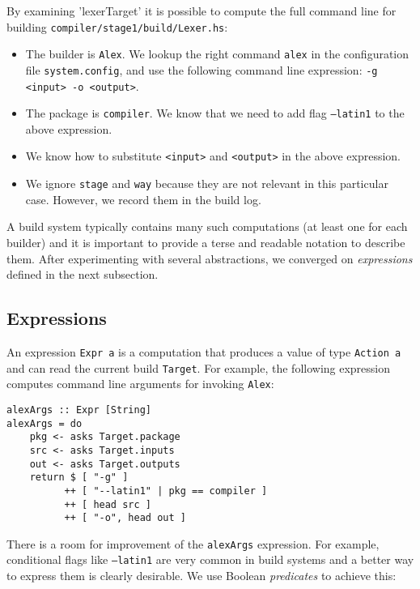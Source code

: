 \noindent By examining \lst'lexerTarget' it is possible to compute the full
command line for building \texttt{compiler/stage1/build/Lexer.hs}:
\begin{itemize}
  \item The builder is \texttt{Alex}. We lookup the right command
  \texttt{alex} in the configuration file \texttt{system.config}, and use the
  following command line expression: \texttt{-g <input> -o <output>}.
  \item The package is \texttt{compiler}. We know that we need to add
  flag \texttt{--latin1} to the above expression.
  \item We know how to substitute \texttt{<input>} and \texttt{<output>} in the
  above expression.
  \item We ignore \texttt{stage} and \texttt{way} because they are not relevant
  in this particular case. However, we record them in the build log.
\end{itemize}

\noindent A build system typically contains many such computations (at least one
for each builder) and it is important to provide a terse and readable notation to
describe them. After experimenting with several abstractions, we converged on
\emph{expressions} defined in the next subsection.

\subsection{Expressions}

An expression \texttt{Expr a} is a computation that produces a value of type
\texttt{Action a} and can read the current build \texttt{Target}. For example,
the following expression computes command line arguments for invoking
\texttt{Alex}:

\begin{lstlisting}[basicstyle=\ttfamily]
alexArgs :: Expr [String]
alexArgs = do
    pkg <- asks Target.package
    src <- asks Target.inputs
    out <- asks Target.outputs
    return $ [ "-g" ]
          ++ [ "--latin1" | pkg == compiler ]
          ++ [ head src ]
          ++ [ "-o", head out ]
\end{lstlisting}


There is a room for improvement of the \texttt{alexArgs} expression. For
example, conditional flags like \texttt{--latin1} are very common in build
systems and a better way to express them is clearly desirable. We use Boolean
\emph{predicates} to achieve this:

